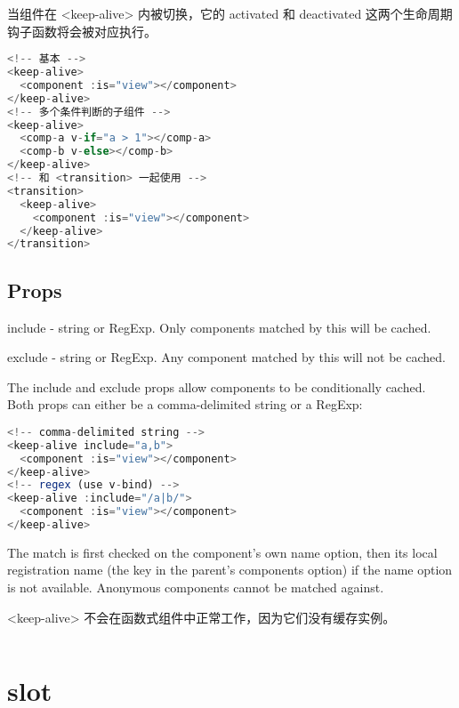 当组件在 <keep-alive> 内被切换，它的 activated 和 deactivated 这两个生命周期钩子函数将会被对应执行。

\begin{lstlisting}[language=JavaScript]
<!-- 基本 -->
<keep-alive>
  <component :is="view"></component>
</keep-alive>
<!-- 多个条件判断的子组件 -->
<keep-alive>
  <comp-a v-if="a > 1"></comp-a>
  <comp-b v-else></comp-b>
</keep-alive>
<!-- 和 <transition> 一起使用 -->
<transition>
  <keep-alive>
    <component :is="view"></component>
  </keep-alive>
</transition>
\end{lstlisting}


\subsection{Props}

\begin{compactitem}
\item include - string or RegExp. Only components matched by this will be cached.
\item exclude - string or RegExp. Any component matched by this will not be cached.
\end{compactitem}

The include and exclude props allow components to be conditionally cached. Both props can either be a comma-delimited string or a RegExp:



\begin{lstlisting}[language=JavaScript]
<!-- comma-delimited string -->
<keep-alive include="a,b">
  <component :is="view"></component>
</keep-alive>
<!-- regex (use v-bind) -->
<keep-alive :include="/a|b/">
  <component :is="view"></component>
</keep-alive>
\end{lstlisting}


The match is first checked on the component’s own name option, then its local registration name (the key in the parent’s components option) if the name option is not available. Anonymous components cannot be matched against.


<keep-alive> 不会在函数式组件中正常工作，因为它们没有缓存实例。


\begin{lstlisting}[language=JavaScript]

\end{lstlisting}




\section{slot}





